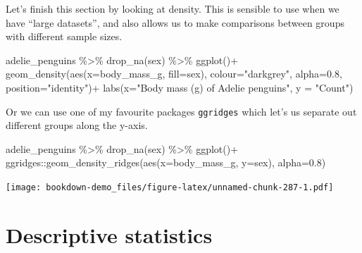 \documentclass[
]{book}
\newenvironment{Shaded}{\begin{snugshade}}{\end{snugshade}}
\newcommand{\AttributeTok}[1]{\textcolor[rgb]{0.77,0.63,0.00}{#1}}
\newcommand{\FloatTok}[1]{\textcolor[rgb]{0.00,0.00,0.81}{#1}}
\newcommand{\FunctionTok}[1]{\textcolor[rgb]{0.00,0.00,0.00}{#1}}
\newcommand{\NormalTok}[1]{#1}
\newcommand{\SpecialCharTok}[1]{\textcolor[rgb]{0.00,0.00,0.00}{#1}}
\newcommand{\StringTok}[1]{\textcolor[rgb]{0.31,0.60,0.02}{#1}}
\begin{document}
Let's finish this section by looking at density. This is sensible to use when we have ``large datasets'', and also allows us to make comparisons between groups with different sample sizes.

\begin{Shaded}
\begin{Highlighting}[]
\NormalTok{adelie\_penguins }\SpecialCharTok{\%\textgreater{}\%} 
  \FunctionTok{drop\_na}\NormalTok{(sex) }\SpecialCharTok{\%\textgreater{}\%} 
\FunctionTok{ggplot}\NormalTok{()}\SpecialCharTok{+}
  \FunctionTok{geom\_density}\NormalTok{(}\FunctionTok{aes}\NormalTok{(}\AttributeTok{x=}\NormalTok{body\_mass\_g,}
                     \AttributeTok{fill=}\NormalTok{sex),}
                 \AttributeTok{colour=}\StringTok{"darkgrey"}\NormalTok{,}
                 \AttributeTok{alpha=}\FloatTok{0.8}\NormalTok{,}
                 \AttributeTok{position=}\StringTok{"identity"}\NormalTok{)}\SpecialCharTok{+}
  \FunctionTok{labs}\NormalTok{(}\AttributeTok{x=}\StringTok{"Body mass (g) of Adelie penguins"}\NormalTok{,}
       \AttributeTok{y =} \StringTok{"Count"}\NormalTok{)}
\end{Highlighting}
\end{Shaded}

Or we can use one of my favourite packages \texttt{ggridges} \citet{R-ggridges} which let's us separate out different groups along the y-axis.

\begin{Shaded}
\begin{Highlighting}[]
\NormalTok{adelie\_penguins }\SpecialCharTok{\%\textgreater{}\%} 
  \FunctionTok{drop\_na}\NormalTok{(sex) }\SpecialCharTok{\%\textgreater{}\%} 
\FunctionTok{ggplot}\NormalTok{()}\SpecialCharTok{+}
\NormalTok{  ggridges}\SpecialCharTok{::}\FunctionTok{geom\_density\_ridges}\NormalTok{(}\FunctionTok{aes}\NormalTok{(}\AttributeTok{x=}\NormalTok{body\_mass\_g,}
                                    \AttributeTok{y=}\NormalTok{sex),}
                                    \AttributeTok{alpha=}\FloatTok{0.8}\NormalTok{)}
\end{Highlighting}
\end{Shaded}

\texttt{[image: bookdown-demo\_files/figure-latex/unnamed-chunk-287-1.pdf]}

\hypertarget{descriptive-statistics}{%
\section{Descriptive statistics}\label{descriptive-statistics}}
\end{document}

